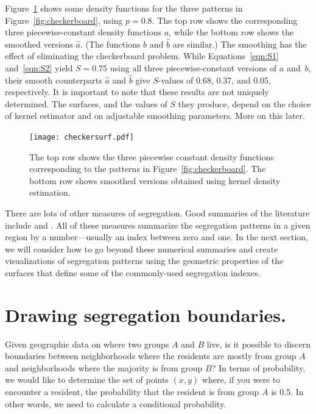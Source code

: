 \documentclass{article}
\theoremstyle{theorem}
\theoremstyle{definition}
\begin{document}
Figure~\ref{fig:kdeexamples} shows some density functions for the three patterns in Figure~\ref{fig:checkerboard}, using $p = 0.8$. The top row shows the corresponding three piecewise-constant density functions $a$, while the bottom row shows the smoothed versions $\hat{a}$. (The functions $b$ and $\hat{b}$ are similar.) The smoothing has the effect of eliminating the checkerboard problem. While Equations~\ref{eqn:S1} and~\ref{eqn:S2} yield $S = 0.75$ using all three piecewise-constant versions of $a$ and~$b$, their smooth counterparts $\hat{a}$ and $\hat{b}$ give $S$-values of 0.68, 0.37, and 0.05, respectively.
It is important to note that these results are not uniquely determined. The surfaces, and the values of $S$ they produce, depend on the choice of kernel estimator and on adjustable smoothing parameters. More on this later.

\begin{figure}
  \texttt{[image: checkersurf.pdf]} %
  \caption{The top row shows the three piecewise constant density functions corresponding to the patterns in Figure~\ref{fig:checkerboard}. The bottom row shows smoothed versions obtained using kernel density estimation.}
  \label{fig:kdeexamples}
\end{figure}

There are lots of other measures of segregation. Good summaries of the literature include \cite{reardonosullivan04} and \cite{harrisjohnson18}. All of these measures summarize the segregation patterns in a given region by a number---usually an index between zero and one. In the next section, we will consider how to go beyond these numerical summaries and create visualizations of segregation patterns using the geometric properties of the surfaces that define some of the commonly-used segregation indexes.

\section{Drawing segregation boundaries.}

Given geographic data on where two groups $A$ and $B$ live, is it possible to discern boundaries between neighborhoods where the residents are mostly from group $A$ and neighborhoods where the majority is from group $B$? In terms of probability, we would like to determine the set of points $(x,y)$ where, if you were to encounter a resident, the probability that the resident is from group $A$ is 0.5. In other words, we need to calculate a conditional probability.
\end{document}
